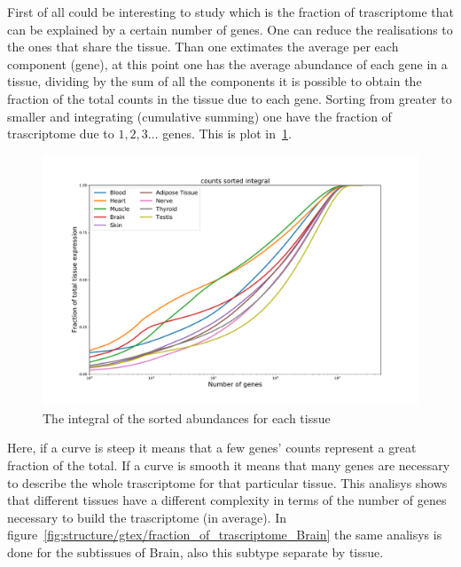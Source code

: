 First of all could be interesting to study which is the fraction of trascriptome that can be explained by a certain number of genes.
One can reduce the realisations to the ones that share the tissue. Than one extimates the average per each component (gene), at this point one has the average abundance of each gene in a tissue, dividing by the sum of all the components it is possible to obtain the fraction of the total counts in the tissue due to each gene. Sorting from greater to smaller and integrating (cumulative summing) one have the fraction of trascriptome due to $1, 2, 3\dots$ genes. This is plot in~\ref{fig:structure/gtex/fraction_of_trascriptome}. 
\begin{figure}[htb!]
  \centering
  \includegraphics[width=0.9\linewidth]{pictures/structure/gtex/fraction_of_trascriptome.pdf}
  \caption{The integral of the sorted abundances for each tissue}
  \label{fig:structure/gtex/fraction_of_trascriptome}
\end{figure}
Here, if a curve is steep it means that a few genes' counts represent a great fraction of the total. If a curve is smooth it means that many genes are necessary to describe the whole trascriptome for that particular tissue.
This analisys shows that different tissues have a different complexity in terms of the number of genes necessary to build the trascriptome (in average).
In figure~\ref{fig:structure/gtex/fraction_of_trascriptome_Brain} the same analisys is done for the subtissues of Brain, also this subtype separate by tissue.
